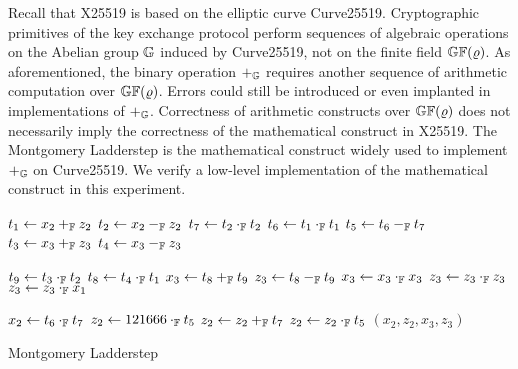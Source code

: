 

Recall that X25519 is based on the elliptic curve Curve25519. 
Cryptographic primitives of the key exchange protocol perform
sequences of algebraic operations on the Abelian group $\mathbb{G}$ induced
by Curve25519, not on the finite field $\mathbb{GF}(\varrho)$. As
aforementioned, the binary operation $+_{\mathbb{G}}$ requires another
sequence of arithmetic computation over $\mathbb{GF}(\varrho)$. Errors
could still be introduced or even implanted in implementations of
$+_{\mathbb{G}}$. Correctness of arithmetic constructs over $\mathbb{GF}(\varrho)$
does not necessarily imply the correctness of the mathematical
construct in X25519. The Montgomery Ladderstep is the mathematical
construct widely used to implement $+_{\mathbb{G}}$ on Curve25519. We 
verify a low-level implementation of the mathematical construct in
this experiment. 


\begin{algorithm}[h]
\label{evaluation:ladder-step:montgomery}
\begin{algorithmic}[1]
\begin{multicols}{3}
\State $t_1 \leftarrow x_2 +_{\mathbb{F}} z_2$
\State $t_2 \leftarrow x_2 -_{\mathbb{F}} z_2$
\State $t_7 \leftarrow t_2 \cdot_{\mathbb{F}} t_2$
\State $t_6 \leftarrow t_1 \cdot_{\mathbb{F}} t_1$
\State $t_5 \leftarrow t_6 -_{\mathbb{F}} t_7$
\State $t_3 \leftarrow x_3 +_{\mathbb{F}} z_3$
\State $t_4 \leftarrow x_3 -_{\mathbb{F}} z_3$\rule{0ex}{0ex}
\State $t_9 \leftarrow t_3 \cdot_{\mathbb{F}} t_2$
\State $t_8 \leftarrow t_4 \cdot_{\mathbb{F}} t_1$
\State $x_3 \leftarrow t_8 +_{\mathbb{F}} t_9$
\State $z_3 \leftarrow t_8 -_{\mathbb{F}} t_9$
\State $x_3 \leftarrow x_3 \cdot_{\mathbb{F}} x_3$
\State $z_3 \leftarrow z_3 \cdot_{\mathbb{F}} z_3$
\State $z_3 \leftarrow z_3 \cdot_{\mathbb{F}} x_1$\rule{0ex}{0ex} 
\State $x_2 \leftarrow t_6 \cdot_{\mathbb{F}} t_7$
\State $z_2 \leftarrow  121666 \cdot_{\mathbb{F}} t_5$
\State $z_2 \leftarrow z_2 +_{\mathbb{F}} t_7$
\State $z_2 \leftarrow z_2 \cdot_{\mathbb{F}} t_5$
\State \Return $(x_2, z_2, x_3, z_3)$
\EndFunction
\end{multicols}
\end{algorithmic}
\caption{Montgomery Ladderstep}
\end{algorithm}

 
